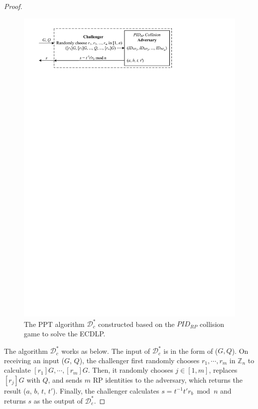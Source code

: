 \begin{proof}
    \begin{figure}[tb]
      \centering
      \includegraphics[width=0.96\linewidth]{fig/ecdlp_algorithm.pdf}
      \caption{The PPT algorithm $\mathcal{D}^*_c$ constructed based on the $PID_{RP}$ collision game to solve the ECDLP.}
      \label{fig:ecdlp_algorithm}
    \end{figure}
  
    The algorithm $\mathcal{D}^*_c$ works as below.
    The input of $\mathcal{D}^*_c$ is in the form of ($G, Q$). On receiving an input ($G$, $Q$), the challenger first randomly chooses $r_1, \cdots, r_m$ in $\mathbb{Z}_n$ to calculate $[r_1]G, \cdots, [r_m]G$.
    Then, it randomly chooses $j \in [1,m]$, replaces $[r_j]G$ with $Q$, and sends $m$ RP identities to the adversary, which returns the result ($a$, $b$, $t$, $t'$). Finally, the challenger calculates $s = t^{-1}t'r_b \bmod n$ and returns $s$ as the output of $\mathcal{D}^*_c$.
  

\end{proof}
